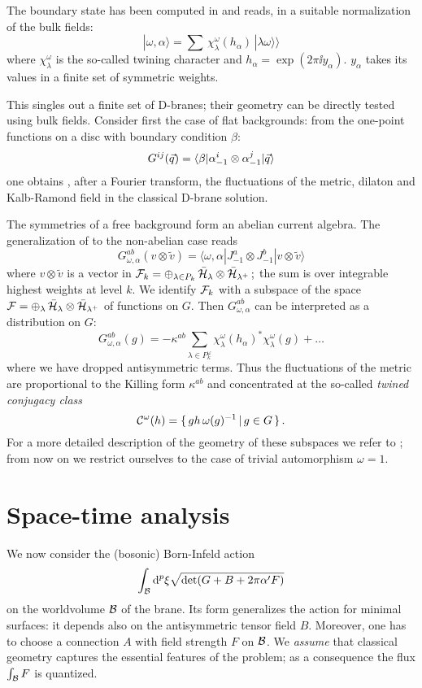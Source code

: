 \documentclass[a4paper,12pt]{article} \usepackage{amssymb,amsfonts,latexsym}
\begin{document}
The boundary state has been computed in \cite{bifs} and reads,
in a suitable normalization of the bulk fields:
$$ |\omega,\alpha\rangle = \sum \, \chi_\lambda^\omega(h_\alpha) \,
|\lambda\omega\rangle\rangle $$
where $\chi_\lambda^\omega$ is the so-called twining character
\cite{fusS3} and $h_\alpha = \exp(2\pi\ii y_\alpha)$. 
$y_\alpha$ takes its values in a finite set of symmetric weights.

This singles out a finite set of D-branes; their geometry can be
directly tested using bulk fields. Consider first the case of flat
backgrounds: from the one-point functions on a disc with boundary
condition $\beta$:
\begin{equation} 
G^{ij} (\vec q) = \langle \beta | \alpha_{-1}^i\otimes \alpha_{-1}^j|\vec 
q\rangle \label1 \end{equation}
one obtains \cite{dfpslr}, after a Fourier transform, the fluctuations
of the metric, dilaton and Kalb-Ramond field in the classical D-brane
solution.

The symmetries of a free background form an abelian current algebra.
The generalization of  to the non-abelian case reads
$$G^{ab}_{\omega,\alpha} (v\otimes \tilde v) = 
\langle \omega,\alpha| J^a_{-1}\otimes J^b_{-1} | v\otimes \tilde v\rangle
$$ 
where $v\otimes\tilde v$ is a vector in
$ {\cal F}_k = \oplus_{\lambda\in P_k} \, \bar{{\cal H}}_\lambda\otimes
\bar{{\cal H}}_{\lambda^+} \,; $
the sum is over integrable highest weights at level $k$. We identify
${\cal F}_k$ with a subspace of the space 
$ {\cal F} = \oplus_{\lambda} \, \bar{{\cal H}}_\lambda\otimes \bar{{\cal H}}_{\lambda^+}$
of functions on $G$. Then $G^{ab}_{\omega,\alpha}$ can be interpreted 
\cite{fffs} as a distribution on $G$:
$$ G^{ab}_{\omega,\alpha}(g) = - \kappa^{ab} \sum_{\lambda\in P^\omega_k} 
\chi_\lambda^\omega(h_\alpha)^* \chi_\lambda^\omega(g) + \ldots $$
where we have dropped antisymmetric terms. Thus the fluctuations of the
metric are proportional to the Killing form $\kappa^{ab}$ and
concentrated at the so-called {\em twined conjugacy class}
$$ {\cal C}^\omega(h) = \{ \, g h \,\omega(g)^{-1}\,  |\,  g\in G \, \} \,. $$
For a more detailed description of the geometry of these subspaces we
refer to \cite{fffs}; from now on we restrict ourselves to the
case of trivial automorphism $\omega=1$.

\section{Space-time analysis}

We now consider the (bosonic) Born-Infeld action
\begin{equation}
\int_{{\cal B}} {\rm d}^p \xi \sqrt{\det(G + B + 2\pi\alpha' F)} 
\label{dbi} \end{equation}
on the worldvolume ${\cal B}$ of the brane. Its form generalizes the action for 
minimal surfaces: it depends also on the antisymmetric tensor field $B$. 
Moreover, one has to choose a connection $A$ with field strength $F$ on ${\cal B}$.
We {\em assume} that classical geometry captures the essential features of the 
problem; as a consequence the flux $\int_{{\cal B}} F$ is quantized.
\end{document}

